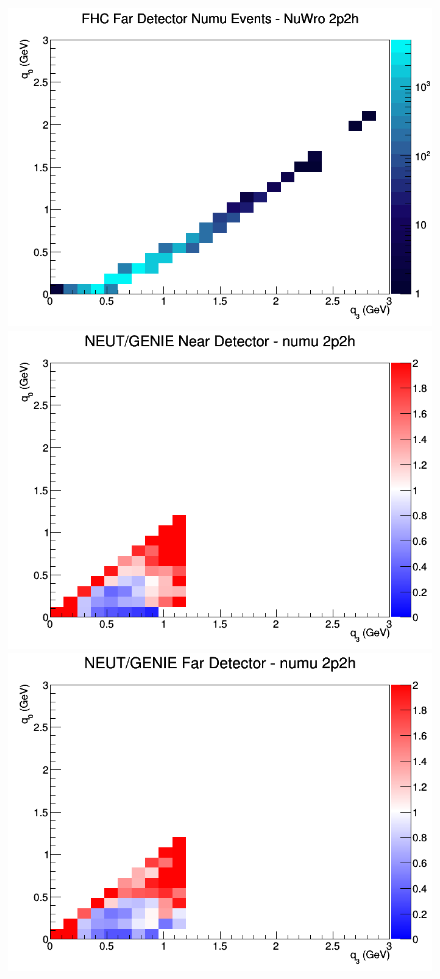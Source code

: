 \begin{figure}[h]
\endminipage
{}
\includegraphics[width=\linewidth]{q0_q3/nominal/2p2h_FHC_FD_numu_q3_q0_NuWro.png}
\endminipage
\newline
{}
\includegraphics[width=\linewidth]{q0_q3/nominal/ratios/2p2h_NEUT_GENIE_numu_near_q3_q0.png}
\endminipage
{}
\includegraphics[width=\linewidth]{q0_q3/nominal/ratios/2p2h_NEUT_GENIE_numu_far_q3_q0.png}

\end{figure}
